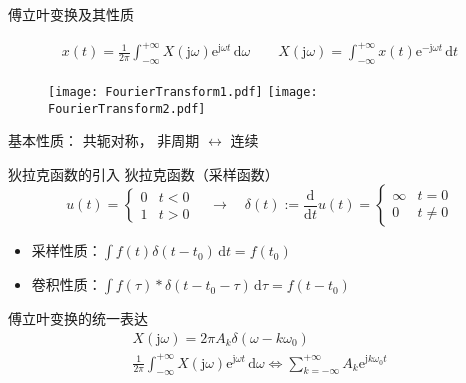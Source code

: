 \documentclass[UTF8]{ctexbeamer}
\begin{document}
\begin{frame}{傅立叶变换及其性质}
    \begin{tcolorbox}[top=0mm,
        title = 傅立叶变换（Fourier Transform）,
        boxrule = 0.3pt,
        fontupper = \normalcolor\small]
        \begin{gather*}
            x(t) = \frac{1}{2\pi} \int_{-\infty}^{+\infty} X(\mathrm{j}\omega) \mathrm{e}^{\mathrm{j}\omega t}\,\mathrm{d}\omega 
            \qquad
            X(\mathrm{j}\omega) = \int_{-\infty}^{+\infty} x(t) \mathrm{e}^{-\mathrm{j}\omega t}\,\mathrm{d}t 
        \end{gather*}
    \end{tcolorbox}
    
    \begin{figure}
        \centering
        \texttt{[image: FourierTransform1.pdf]}
        \hspace{20pt}
        \texttt{[image: FourierTransform2.pdf]}
    \end{figure}

    基本性质：
    共轭对称， 
    非周期 $\leftrightarrow$ 连续
\end{frame}



\begin{frame}{狄拉克函数的引入}
    狄拉克函数（采样函数）
    \begin{equation*}
        u(t) = \left\{\begin{array}{cl}
            0 & t < 0 \\
            1 & t > 0
        \end{array}\right.
        \quad \rightarrow \quad
        \delta (t) := \frac{\mathrm{d}}{\mathrm{d}t} u(t) = \left\{\begin{array}{cl}
            \infty & t = 0 \\
            0 & t \ne 0
        \end{array}\right. 
    \end{equation*}

    \begin{itemize}
        \item 采样性质：$\int f(t) \delta (t-t_0) \, \mathrm{d} t = f(t_0)$
        \item 卷积性质：$\int f(\tau) \ast \delta (t-t_0-\tau) \, \mathrm{d} \tau = f(t-t_0)$
    \end{itemize}

    傅立叶变换的统一表达
    \begin{gather*}
        X(\mathrm{j}\omega) = 2 \pi A_k \delta (\omega - k\omega_0)\\
        \frac{1}{2\pi} \int_{-\infty}^{+\infty} X(\mathrm{j}\omega) \mathrm{e}^{\mathrm{j}\omega t}\,\mathrm{d}\omega 
        \Leftrightarrow  \sum_{k=-\infty}^{+\infty} A_k \mathrm{e}^{\mathrm{j}k\omega_0t}  
    \end{gather*}
\end{frame}
\end{document}
